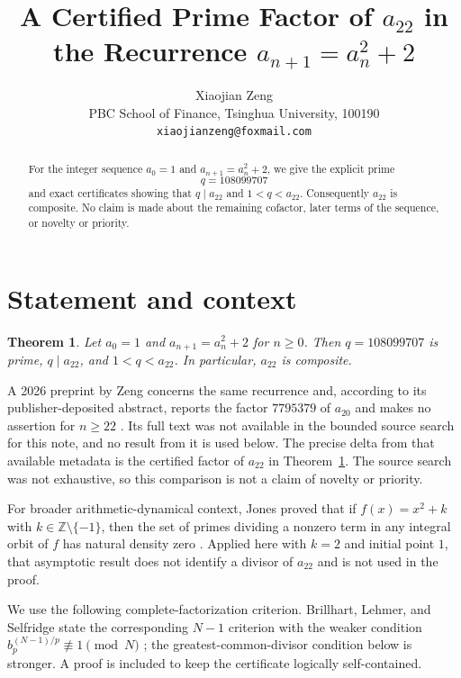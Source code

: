 \documentclass[11pt]{article}
\title{A Certified Prime Factor of $a_{22}$ in the Recurrence
  $a_{n+1}=a_n^2+2$}
\author{Xiaojian Zeng\\
  PBC School of Finance, Tsinghua University, 100190\\
  \texttt{xiaojianzeng@foxmail.com}}
\date{}
\newtheorem{theorem}{Theorem}
\begin{document}
\maketitle

\begin{abstract}
For the integer sequence $a_0=1$ and $a_{n+1}=a_n^2+2$, we give the
explicit prime
\[
q=108099707
\]
and exact certificates showing that $q\mid a_{22}$ and $1<q<a_{22}$.
Consequently $a_{22}$ is composite.  No claim is made about the remaining
cofactor, later terms of the sequence, or novelty or priority.
\end{abstract}

\section{Statement and context}

\begin{theorem}\label{thm:main}
Let $a_0=1$ and $a_{n+1}=a_n^2+2$ for $n\geq0$.  Then
$q=108099707$ is prime, $q\mid a_{22}$, and $1<q<a_{22}$.  In particular,
$a_{22}$ is composite.
\end{theorem}

A 2026 preprint by Zeng concerns the same recurrence and, according to its
publisher-deposited abstract, reports the factor $7795379$ of $a_{20}$ and
makes no assertion for $n\geq22$ \cite{Zeng2026SSRN7395382}.  Its full text
was not available in the bounded source search for this note, and no result
from it is used below.  The precise delta from that available metadata is the
certified factor of $a_{22}$ in Theorem~\ref{thm:main}.  The source search was
not exhaustive, so this comparison is not a claim of novelty or priority.

For broader arithmetic-dynamical context, Jones proved that if
$f(x)=x^2+k$ with $k\in\mathbb Z\setminus\{-1\}$, then the set of primes
dividing a nonzero term in any integral orbit of $f$ has natural density zero
\cite[Theorem~1.2]{Jones2008Density}.  Applied here with $k=2$ and initial
point $1$, that asymptotic result does not identify a divisor of $a_{22}$ and
is not used in the proof.

We use the following complete-factorization criterion.  Brillhart, Lehmer,
and Selfridge state the corresponding $N-1$ criterion with the weaker
condition
$b_p^{(N-1)/p}\not\equiv1\pmod N$
\cite[Theorem~1]{BrillhartLehmerSelfridge1975}; the greatest-common-divisor
condition below is stronger.  A proof is included to keep the certificate
logically self-contained.
\end{document}
